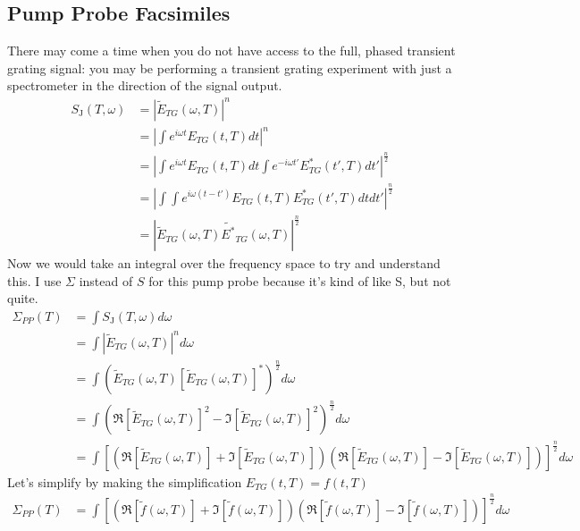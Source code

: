 \subsection{Pump Probe Facsimiles}
There may come a time when you do not have access to the full, phased transient grating signal: you may be performing a transient grating experiment with just a spectrometer in the direction of the signal output.
\begin{align}
	S_{\text{J}} (T, \omega) &=  \left| \tilde{E}_{TG} (\omega, T)  \right|^n \\
	&=  \left| \int e^{i \omega t} E_{TG} (t, T)  dt \right|^n \\
	&=  \left| \int e^{i \omega t} E_{TG} (t, T)  dt   \int e^{-i \omega t'} E^*_{TG} (t', T)  dt'  \right|^{\frac{n}{2}}\\
	&=  \left| \int \int e^{i \omega (t - t')} E_{TG} (t, T)   E^*_{TG} (t', T) dt  dt'  \right|^{\frac{n}{2}} 	\\
	&=  \left| \tilde{E}_{TG} (\omega, T)  \tilde{E^*}_{TG} (\omega, T)  \right|^{\frac{n}{2}}
\end{align}
Now we would take an integral over the frequency space to try and understand this.  I use $\Sigma$ instead of $S$ for this pump probe because it's kind of like S, but not quite.
\begin{align}
	\Sigma_{PP} (T) &= \int S_{\text{J}} (T, \omega) d\omega \\
	&=  \int \left| \tilde{E}_{TG} (\omega, T)  \right|^n d\omega \\
	&= \int \left( \tilde{E}_{TG} (\omega, T)  \left[ \tilde{E}_{TG} (\omega, T)\right]^*  \right)^{\frac{n}{2}} 	d \omega\\
	&= \int \left( \Re \left[ \tilde{E}_{TG} (\omega, T)  \right]^2 - \Im \left[ \tilde{E}_{TG} (\omega, T)  \right]^2 \right)^{\frac{n}{2}} 	d \omega\\
	&= \int \left[ \left( \Re \left[ \tilde{E}_{TG} (\omega, T)  \right] + \Im \left[ \tilde{E}_{TG} (\omega, T)  \right] \right) \left( \Re \left[ \tilde{E}_{TG} (\omega, T)  \right] - \Im \left[ \tilde{E}_{TG} (\omega, T)  \right] \right) \right]^{\frac{n}{2}} 	d \omega
\end{align}
Let's simplify by making the simplification $ E_{TG}(t, T) = f(t, T)$
\begin{align}
	\Sigma_{PP} (T) &= \int \left[ \left( \Re \left[ \tilde{f}(\omega, T)  \right] + \Im \left[ \tilde{f}(\omega, T)  \right] \right) \left( \Re \left[ \tilde{f} (\omega, T)  \right] - \Im \left[ \tilde{f} (\omega, T)  \right] \right) \right]^{\frac{n}{2}} 	d \omega
\end{align}
